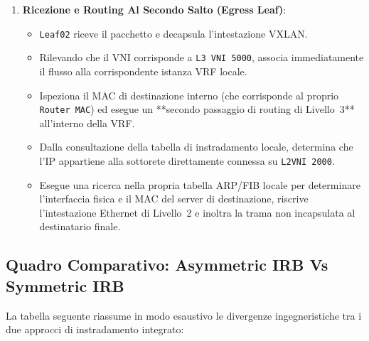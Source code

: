 \documentclass[11pt, a4paper]{article}
\begin{document}
\begin{enumerate}
\begin{itemize}[noitemsep]
    \end{itemize}
    \item \textbf{Ricezione e Routing Al Secondo Salto (Egress Leaf)}:
    \begin{itemize}[noitemsep]
        \item \texttt{Leaf02} riceve il pacchetto e decapsula l'intestazione VXLAN.
        \item Rilevando che il VNI corrisponde a \texttt{L3 VNI 5000}, associa immediatamente il flusso alla corrispondente istanza VRF locale.
        \item Ispeziona il MAC di destinazione interno (che corrisponde al proprio \texttt{Router MAC}) ed esegue un **secondo passaggio di routing di Livello~3** all'interno della VRF.
        \item Dalla consultazione della tabella di instradamento locale, determina che l'IP appartiene alla sottorete direttamente connessa su \texttt{L2VNI 2000}.
        \item Esegue una ricerca nella propria tabella ARP/FIB locale per determinare l'interfaccia fisica e il MAC del server di destinazione, riscrive l'intestazione Ethernet di Livello~2 e inoltra la trama non incapsulata al destinatario finale.
    \end{itemize}
\end{enumerate}

\subsection{Quadro Comparativo: Asymmetric IRB Vs Symmetric IRB}

La tabella seguente riassume in modo esaustivo le divergenze ingegneristiche tra i due approcci di instradamento integrato:
\end{document}
